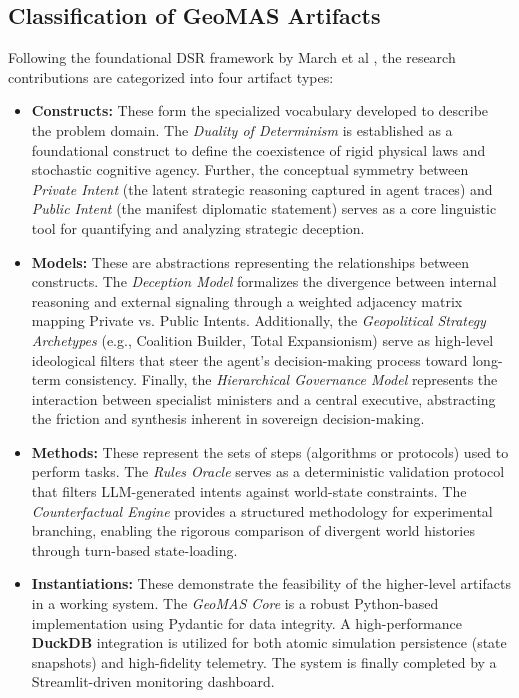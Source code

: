 \subsection{Classification of GeoMAS Artifacts}
Following the foundational DSR framework by March et al \cite{march1995design}, the research contributions are categorized into four artifact types:
\begin{itemize}
    \item \textbf{Constructs:} These form the specialized vocabulary developed to describe the problem domain. The \textit{Duality of Determinism} is established as a foundational construct to define the coexistence of rigid physical laws and stochastic cognitive agency. Further, the conceptual symmetry between \textit{Private Intent} (the latent strategic reasoning captured in agent traces) and \textit{Public Intent} (the manifest diplomatic statement) serves as a core linguistic tool for quantifying and analyzing strategic deception.
    
    \item \textbf{Models:} These are abstractions representing the relationships between constructs. The \textit{Deception Model} formalizes the divergence between internal reasoning and external signaling through a weighted adjacency matrix mapping Private vs. Public Intents. Additionally, the \textit{Geopolitical Strategy Archetypes} (e.g., Coalition Builder, Total Expansionism) serve as high-level ideological filters that steer the agent's decision-making process toward long-term consistency. Finally, the \textit{Hierarchical Governance Model} represents the interaction between specialist ministers and a central executive, abstracting the friction and synthesis inherent in sovereign decision-making.

    
    \item \textbf{Methods:} These represent the sets of steps (algorithms or protocols) used to perform tasks. The \textit{Rules Oracle} serves as a deterministic validation protocol that filters LLM-generated intents against world-state constraints. The \textit{Counterfactual Engine} provides a structured methodology for experimental branching, enabling the rigorous comparison of divergent world histories through turn-based state-loading.
    
    \item \textbf{Instantiations:} These demonstrate the feasibility of the higher-level artifacts in a working system. The \textit{GeoMAS Core} is a robust Python-based implementation using Pydantic for data integrity. A high-performance \textbf{DuckDB} integration is utilized for both atomic simulation persistence (state snapshots) and high-fidelity telemetry. The system is finally completed by a Streamlit-driven monitoring dashboard.
\end{itemize}



